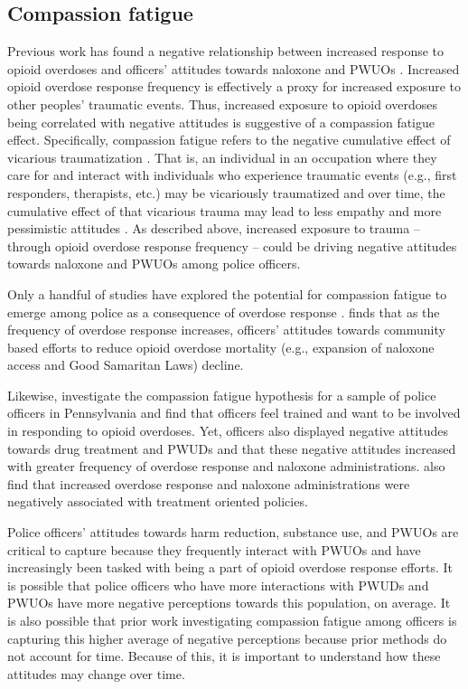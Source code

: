 \subsection{Compassion fatigue}

Previous work has found a negative relationship between increased response to opioid overdoses and officers’ attitudes towards naloxone and PWUOs \parencite{carroll_knowledge_2020, murphy_police_2020, murphy_police_2021}. Increased opioid overdose response frequency is effectively a proxy for increased exposure to other peoples' traumatic events. Thus, increased exposure to opioid overdoses being correlated with negative attitudes is suggestive of a compassion fatigue effect. Specifically, compassion fatigue refers to the negative cumulative effect of vicarious traumatization \parencite{adams_compassion_2006}. That is, an individual in an occupation where they care for and interact with individuals who experience traumatic events (e.g., first responders, therapists, etc.) may be vicariously traumatized and over time, the cumulative effect of that vicarious trauma may lead to less empathy and more pessimistic attitudes \parencite{adams_compassion_2006, figley_compassion_1995}. As described above, increased exposure to trauma -- through opioid overdose response frequency -- could be driving negative attitudes towards naloxone and PWUOs among police officers.

Only a handful of studies have explored the potential for compassion fatigue to emerge among police as a consequence of overdose response \parencite{banta-green_police_2013, saunders_you_2019}. \textcite{carroll_knowledge_2020} finds that as the frequency of overdose response increases, officers' attitudes towards community based efforts to reduce opioid overdose mortality (e.g., expansion of naloxone access and Good Samaritan Laws) decline.

Likewise, \textcite{murphy_police_2020} investigate the compassion fatigue hypothesis for a sample of police officers in Pennsylvania and find that officers feel trained and want to be involved in responding to opioid overdoses. Yet, officers also displayed negative attitudes towards drug treatment and PWUDs and that these negative attitudes increased with greater frequency of overdose response and naloxone administrations. \textcite{murphy_police_2021} also find that increased overdose response and naloxone administrations were negatively associated with treatment oriented policies. 

Police officers’ attitudes towards harm reduction, substance use, and PWUOs are critical to capture because they frequently interact with PWUOs and have increasingly been tasked with being a part of opioid overdose response efforts. It is possible that police officers who have more interactions with PWUDs and PWUOs have more negative perceptions towards this population, on average. It is also possible that prior work investigating compassion fatigue among officers is capturing this higher average of negative perceptions because prior methods do not account for time. Because of this, it is important to understand how these attitudes may change over time. 

